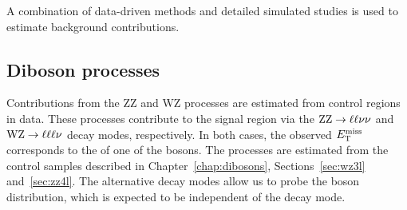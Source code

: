 A combination of data-driven methods and detailed simulated studies is used to
estimate background contributions.


\subsection{Diboson processes}
Contributions from the ZZ and WZ processes are estimated from control regions in data.
These processes contribute to the signal region via the
$\mathrm{Z}\mathrm{Z}\rightarrow\ell\ell\nu\nu$ and $\mathrm{W}\mathrm{Z}\rightarrow\ell\ell\ell\nu$ decay modes, respectively.
In both cases, the observed $E_\mathrm{T}^{\mathrm{miss}}$ corresponds to the \pt of one of the bosons.
The processes are estimated from the control samples described in Chapter~\ref{chap:dibosons}, Sections~\ref{sec:wz3l} and~\ref{sec:zz4l}. 
The alternative decay modes allow us to probe the boson \pt distribution, which is expected to be independent of the decay mode.

